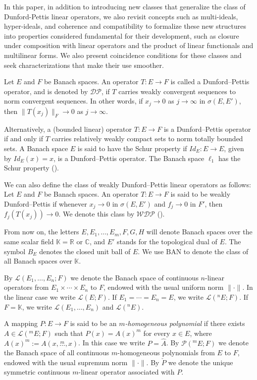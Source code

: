 \documentclass[12 pt]{article}%
\newtheorem{final remark}[theorem]{Final Remark}
\begin{document}
	In this paper, in addition to introducing new classes that generalize the class of Dunford-Pettis linear operators, we also revisit concepts such as multi-ideals, hyper-ideals, and coherence and compatibility to formalize these new structures into properties considered fundamental for their development, such as closure under composition with linear operators and the product of linear functionals and multilinear forms. We also present coincidence conditions for these classes and seek characterizations that make their use smoother.
	

	Let $E$ and $F$ be Banach spaces. An operator $T\colon E \rightarrow F$ is called a Dunford–Pettis operator, and is denoted by $\mathcal{DP}$, if $T$ carries weakly convergent sequences to norm convergent sequences. In other words, if $x_j \to 0$ as $j \to \infty$ in $\sigma(E,E')$, then $\|T(x_j)\|_F \to 0$ as $j \to \infty$.
	
	Alternatively, a (bounded linear) operator $T\colon E \rightarrow F$ is a Dunford–Pettis operator if and only if $T$ carries relatively weakly compact sets to norm totally bounded sets. A Banach space $E$ is said to have the Schur property if $Id_E\colon E \rightarrow E$, given by $Id_E(x)=x$, is a Dunford–Pettis operator. The Banach space $\ell_1$ has the Schur property (\cite[Theorem 2.5.18]{MN91}).
	
	We can also define the class of weakly Dunford–Pettis linear operators as follows: Let $E$ and $F$ be Banach spaces. An operator $T\colon E \rightarrow F$ is said to be weakly Dunford–Pettis if whenever $x_j \to 0$ in $\sigma(E,E')$ and $f_j \to 0$ in $F'$, then $f_j(T(x_j)) \to 0$. We denote this class by $\mathcal{WDP}$ (\cite{AB85}).
	
	From now on, the letters $E,E_{1},\dots,E_{m},F,G,H$ will denote Banach spaces over the same scalar field $\mathbb{K}=\mathbb{R}$ or $\mathbb{C}$, and $E'$ stands for the topological dual of $E$. The symbol $B_E$ denotes the closed unit ball of $E$. We use $\mathrm{BAN}$ to denote the class of all Banach spaces over $\mathbb{K}$.
	
	By $\mathcal{L}(E_1, \ldots, E_n;F)$ we denote the Banach space of continuous $n$-linear operators from $E_1 \times \cdots \times E_n$ to $F$, endowed with the usual uniform norm $\|\cdot\|$. In the linear case we write $\mathcal{L}(E;F)$. If $E_1 = \cdots = E_n = E$, we write $\mathcal{L}(^nE;F)$. If $F = \mathbb{K}$, we write $\mathcal{L}(E_1, \ldots, E_n)$ and $\mathcal{L}(^nE)$.
	
	A mapping $P \colon E \rightarrow F$ is said to be an {\it $m$-homogeneous polynomial} if there exists $A \in \mathcal{L}(^mE; F)$ such that $P(x) = A(x)^m$ for every $x \in E$, where $A(x)^m := A\left(x,\overset{m}{\dots},x\right)$. In this case we write $P = \widehat{A}$. By $\mathcal{P}(^mE;F)$ we denote the Banach space of all continuous $m$-homogeneous polynomials from $E$ to $F$, endowed with the usual supremum norm $\|\cdot\|$. By $\check{P}$ we denote the unique symmetric continuous $m$-linear operator associated with $P$.
	
\end{document}
